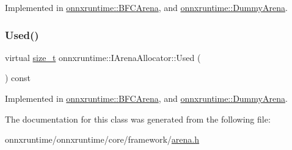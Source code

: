 Implemented in \mbox{\hyperlink{classonnxruntime_1_1BFCArena_a3c5f633150f1f2f4003ee57757c10f11}{onnxruntime\+::\+B\+F\+C\+Arena}}, and \mbox{\hyperlink{classonnxruntime_1_1DummyArena_a8bfa97292cc0bac6cc6c18e913bdcb4c}{onnxruntime\+::\+Dummy\+Arena}}.

\mbox{\label{classonnxruntime_1_1IArenaAllocator_aa6b6994640f86749998ffd0c5da4dd83}} 
\subsubsection{\texorpdfstring{Used()}{Used()}}
{\footnotesize\ttfamily virtual \mbox{\hyperlink{mlasi_8h_a503efbc1c6e50825320ad909366b78ab}{size\+\_\+t}} onnxruntime\+::\+I\+Arena\+Allocator\+::\+Used (\begin{DoxyParamCaption}{ }\end{DoxyParamCaption}) const\hspace{0.3cm}{\ttfamily [pure virtual]}}



Implemented in \mbox{\hyperlink{classonnxruntime_1_1BFCArena_a4e6bd70a40977a1c9db618daa937f9f8}{onnxruntime\+::\+B\+F\+C\+Arena}}, and \mbox{\hyperlink{classonnxruntime_1_1DummyArena_a8d52981f5c7d9c0b098c27405481bc0a}{onnxruntime\+::\+Dummy\+Arena}}.



The documentation for this class was generated from the following file\+:\begin{DoxyCompactItemize}
\item 
onnxruntime/onnxruntime/core/framework/\mbox{\hyperlink{arena_8h}{arena.\+h}}\end{DoxyCompactItemize}
